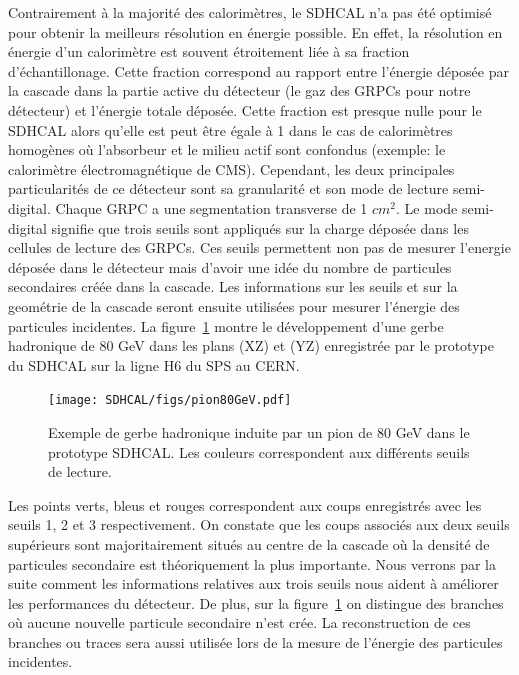 Contrairement à la majorité des calorimètres, le SDHCAL n'a pas été optimisé pour obtenir la meilleurs résolution en énergie possible. En effet, la résolution en énergie d'un calorimètre est souvent étroitement liée à sa fraction d'échantillonage. Cette fraction correspond au rapport entre l'énergie déposée par la cascade dans la partie active du détecteur (le gaz des GRPCs pour notre détecteur) et l'énergie totale déposée. Cette fraction est presque nulle pour le SDHCAL alors qu'elle est peut être égale à 1 dans le cas de calorimètres homogènes où l'absorbeur et le milieu actif sont confondus (exemple: le calorimètre électromagnétique de CMS). Cependant, les deux principales particularités de ce détecteur sont sa granularité et son mode de lecture semi-digital. Chaque GRPC a une segmentation transverse de 1 $cm^2$. Le mode semi-digital signifie que trois seuils sont appliqués sur la charge déposée dans les cellules de lecture des GRPCs. Ces seuils permettent non pas de mesurer l'energie déposée dans le détecteur mais d'avoir une idée du nombre de particules secondaires créée dans la cascade. Les informations sur les seuils et sur la geométrie de la cascade seront ensuite utilisées pour mesurer l'énergie des particules incidentes. La figure~\ref{fig:shower80} montre le développement d'une gerbe hadronique de 80 GeV dans les plans (XZ) et (YZ) enregistrée par le prototype du SDHCAL sur la ligne H6 du SPS au CERN.
\begin{figure}[!h]
  \begin{center}
    \texttt{[image: SDHCAL/figs/pion80GeV.pdf]}
    \caption{Exemple de gerbe hadronique induite par un pion de 80 GeV dans le prototype SDHCAL. Les couleurs correspondent aux différents seuils de lecture.}
    \label{fig:shower80}
  \end{center}
\end{figure}
Les points verts, bleus et rouges correspondent aux coups enregistrés avec les seuils 1, 2 et 3 respectivement. On constate que les coups associés aux deux seuils supérieurs sont majoritairement situés au centre de la cascade où la densité de particules secondaire est théoriquement la plus importante. Nous verrons par la suite comment les informations relatives aux trois seuils nous aident à améliorer les performances du détecteur. De plus, sur la figure~\ref{fig:shower80} on distingue des branches où aucune nouvelle particule secondaire n'est crée. La reconstruction de ces branches ou traces sera aussi utilisée lors de la mesure de l'énergie des particules incidentes.

